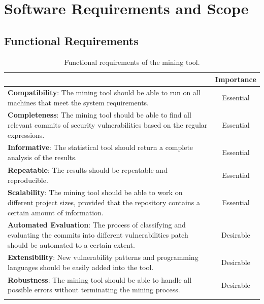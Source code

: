 \documentclass[12pt, a4paper]{report}
\begin{document}
\section{Software Requirements and Scope} \label{sec:software_req}
\subsection{Functional Requirements}
\begin{longtable}{|p{10.3cm}|c|}
  \hline \endfirsthead
  \rowcolor[HTML]{D8D8D8}
  \multicolumn{1}{|c|}{Criteria} & Importance \\ \hline
  \textbf{Compatibility}: The mining tool should be able to run on all machines that meet the
  system requirements. & Essential \\ \hline
  \textbf{Completeness}: The mining tool should be able to find all relevant commits of security
  vulnerabilities based on the regular expressions. & Essential \\ \hline
  \textbf{Informative}: The statistical tool should return a complete analysis of the results. &
  Essential \\ \hline
  \textbf{Repeatable}: The results should be repeatable and reproducible. & Essential \\ \hline
  \textbf{Scalability}: The mining tool should be able to work on different project sizes, provided
  that the repository contains a certain amount of information. & Essential \\ \hline
  \textbf{Automated Evaluation}: The process of classifying and evaluating the commits into
  different vulnerabilities patch should be automated to a certain extent. & Desirable \\ \hline
  \textbf{Extensibility}: New vulnerability patterns and programming languages should be easily
  added into the tool. & Desirable \\ \hline
  \textbf{Robustness}: The mining tool should be able to handle all possible errors without
  terminating the mining process. & Desirable \\ \hline
  \caption{Functional requirements of the mining tool.} \label{table:func_req}
\end{longtable}
\end{document}
